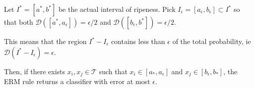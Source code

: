 \documentclass[10pt, table, handout]{beamer}
\begin{document}
\begin{frame}[fragile]{}
\begin{minipage}[t][0.4\textheight][t]{\textwidth}
  \end{minipage}
  \vfill
  \begin{minipage}[t][0.6\textheight][t]{\textwidth}
	Let $I^* = [a^*,b^*]$ be the actual interval of ripeness. Pick $I_{\epsilon}=[a_\epsilon,b_\epsilon] \subset I^*$ so that both $\mathcal{D}([a^*,a_{\epsilon}]) = \epsilon/2$ and $\mathcal{D}([b_\epsilon, b^*]) = \epsilon/2$.\newline

This means that the region $I^*-I_\epsilon$ contains less than $\epsilon$ of the total probability, ie $\mathcal{D}(I^*-I_\epsilon)=\epsilon$.\newline

Then, if there exists $x_i, x_j\in\mathcal{T}$ such that $x_i\in [a_*, a_\epsilon]$ and $x_j\in [b_\epsilon, b_*]$, the ERM rule returns a classifier with error at most $\epsilon$. 

  \end{minipage}

\end{frame}
\end{document}

